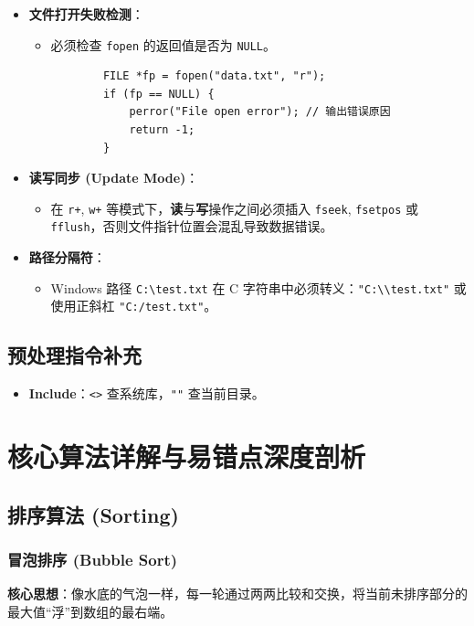 \documentclass[a4paper,12pt]{article}
\begin{document}
\begin{itemize}
    \item \textbf{文件打开失败检测}：
    \begin{itemize}
        \item 必须检查 \texttt{fopen} 的返回值是否为 \texttt{NULL}。
        \begin{lstlisting}
        FILE *fp = fopen("data.txt", "r");
        if (fp == NULL) {
            perror("File open error"); // 输出错误原因
            return -1;
        }
        \end{lstlisting}
    \end{itemize}

    \item \textbf{读写同步 (Update Mode)}：
    \begin{itemize}
        \item 在 \texttt{r+}, \texttt{w+} 等模式下，\textbf{读}与\textbf{写}操作之间必须插入 \texttt{fseek}, \texttt{fsetpos} 或 \texttt{fflush}，否则文件指针位置会混乱导致数据错误。
    \end{itemize}
    
    \item \textbf{路径分隔符}：
    \begin{itemize}
        \item Windows 路径 \texttt{C:\textbackslash test.txt} 在 C 字符串中必须转义：\texttt{"C:\textbackslash\textbackslash test.txt"} 或使用正斜杠 \texttt{"C:/test.txt"}。
    \end{itemize}
\end{itemize}

\subsection{预处理指令补充}
\begin{itemize}
    \item \textbf{Include}：\texttt{<>} 查系统库，\texttt{""} 查当前目录。
\end{itemize}

\section{核心算法详解与易错点深度剖析}

\subsection{排序算法 (Sorting)}

\subsubsection{冒泡排序 (Bubble Sort)}
\textbf{核心思想}：像水底的气泡一样，每一轮通过两两比较和交换，将当前未排序部分的最大值“浮”到数组的最右端。
\end{document}
